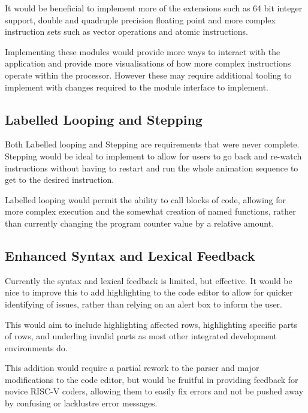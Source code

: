 It would be beneficial to implement more of the extensions such as 64 bit integer support, double and quadruple precision floating point and more complex instruction sets such as vector operations and atomic instructions. 

Implementing these modules would provide more ways to interact with the application and provide more visualisations of how more complex instructions operate within the processor. However these may require additional tooling to implement with changes required to the module interface to implement.

\subsection{Labelled Looping and Stepping}
Both Labelled looping and Stepping are requirements that were never complete. Stepping would be ideal to implement to allow for users to go back and re-watch instructions without having to restart and run the whole animation sequence to get to the desired instruction.

Labelled looping would permit the ability to call blocks of code, allowing for more complex execution and the somewhat creation of named functions, rather than currently changing the program counter value by a relative amount.

\subsection{Enhanced Syntax and Lexical Feedback}
Currently the syntax and lexical feedback is limited, but effective. It would be nice to improve this to add highlighting to the code editor to allow for quicker identifying of issues, rather than relying on an alert box to inform the user.

This would aim to include highlighting affected rows, highlighting specific parts of rows, and underling invalid parts as most other integrated development environments do.

This addition would require a partial rework to the parser and major modifications to the code editor, but would be fruitful in providing feedback for novice RISC-V coders, allowing them to easily fix errors and not be pushed away by confusing or lacklustre error messages.

